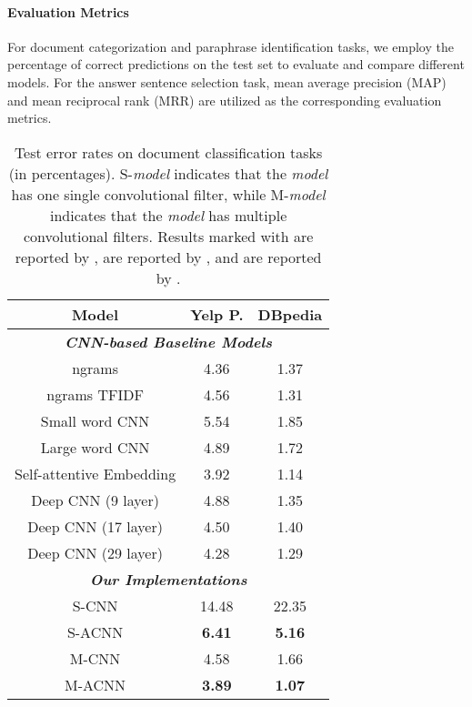 \documentclass[11pt,a4paper]{article}
\begin{document}
\paragraph{Evaluation Metrics}
For document categorization and  paraphrase identification tasks, we employ the percentage of correct predictions on the test set to evaluate and compare different models. For the answer sentence selection task, mean average precision (MAP) and mean reciprocal rank (MRR) are utilized as the corresponding evaluation metrics.

\begin{table}[t!]
	\centering
\begin{tabular}{c|c|c}
		\toprule[1.2pt]
		\textbf{Model} &  	\textbf{Yelp P.} &  	\textbf{DBpedia}  \\
		\hline
		\multicolumn{3}{c}{\emph{\textbf{CNN-based Baseline Models}}} \\
		\hline
		ngrams     & 4.36 &  1.37     \\
		ngrams TFIDF     & 4.56 &  1.31     \\
		Small word CNN        & 5.54 & 1.85  \\ 
		Large word CNN        & 4.89 & 1.72  \\ 
Self-attentive Embedding     & 3.92 & 1.14  \\ 
Deep CNN (9 layer)         &  4.88 & 1.35  \\
		Deep CNN (17 layer)           &  4.50 &  1.40 \\
		Deep CNN (29 layer)       & 4.28 &  1.29 \\
		\hline
		\multicolumn{3}{c}{\emph{\textbf{Our Implementations}}} \\
		\hline
		S-CNN         & 14.48 & 22.35 \\
		S-ACNN         & \textbf{6.41} & \textbf{5.16}  \\
		\hline
		M-CNN         & 4.58 & 1.66 \\
		M-ACNN         & \textbf{3.89} & \textbf{1.07}  \\
		\bottomrule[1.2pt]
	\end{tabular}
\caption{\small Test error rates on document classification tasks (in percentages). S-\emph{model} indicates that the \emph{model} has one single convolutional filter, while M-\emph{model} indicates that the \emph{model} has multiple convolutional filters. Results marked with  are reported by \cite{zhang2015character},  are reported by \cite{conneau2016very}, and  are reported by \cite{lin2017structured}.}
	\label{tab:topic}
\vspace{-4mm}
\end{table}
\end{document}
